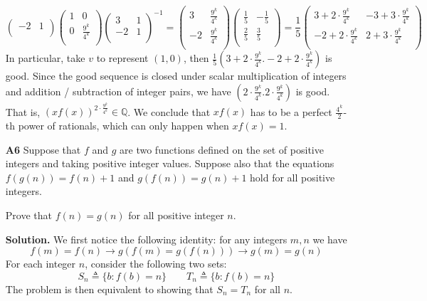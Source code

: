 \documentclass[11pt]{article}
\newcommand{\bbQ}{\mathbb Q}
\newcommand{\<}{\langle}
\renewcommand{\>}{\rangle}
\begin{document}
\begin{enumerate}
\[\begin{pmatrix}
	-2 & 1\\
	\end{pmatrix}
	\begin{pmatrix}
	1 & 0\\
	0 & \frac{9^k}{4^k}\\
	\end{pmatrix}
	\begin{pmatrix}
	3 & 1\\
	-2 & 1\\
	\end{pmatrix}^{-1}
	=
	\begin{pmatrix}
	3 & \frac{9^k}{4^k}\\
	-2 & \frac{9^k}{4^k}\\
	\end{pmatrix}
	\begin{pmatrix}
	\frac{1}{5} & -\frac{1}{5}\\
	\frac{2}{5} & \frac{3}{5}\\
	\end{pmatrix}
	=\frac 15
	\begin{pmatrix}
	3 + 2\cdot \frac{9^k}{4^k} & -3+3\cdot \frac{9^k}{4^k}\\
	-2 +2\cdot \frac{9^k}{4^k} & 2+3\cdot \frac{9^k}{4^k}\\
	\end{pmatrix}
	\]
	In particular, take $v$ to represent $(1, 0)$, then $\frac 15(3+2\cdot \frac{9^k}{4^k}. -2+2\cdot \frac{9^k}{4^k})$ is good. 
	Since the good sequence is closed under scalar multiplication of integers and addition / subtraction of integer pairs, we have 
	$(2\cdot \frac{9^k}{4^k}. 2\cdot \frac{9^k}{4^k})$ is good. 
	That is, $(xf(x))^{2\cdot \frac{9^k}{4^k}}\in\bbQ$. 
	We conclude that $xf(x)$ has to be a perfect $\frac{4^k}{2}$-th power of rationals, which can only happen when $xf(x)=1$. 
	
	\item [\textbf{A6}] 
	Suppose that $f$ and $g$ are two functions defined on the set of positive integers and taking positive integer values. Suppose also that the equations $f(g(n)) = f(n) + 1$ and $g(f(n)) = g(n) + 1$ hold for all positive integers. 
	
	Prove that $f(n) = g(n)$ for all positive integer $n.$
	
	\textbf{Solution.} 
	We first notice the following identity: for any integers $m, n$ we have 
	\begin{equation}\label{eq:a6_mn}
		f(m) = f(n)\to g(f(m) = g(f(n)))\to g(m) = g(n)
	\end{equation}
	For each integer $n$, consider the following two sets: 
	\begin{equation}
		S_n\triangleq \{b: f(b) = n\}
		\qquad 
		T_n\triangleq \{b: f(b) = n\}
	\end{equation}
    The problem is then equivalent to showing that $S_n = T_n$ for all $n$. 
    

\end{enumerate}
\end{document}
